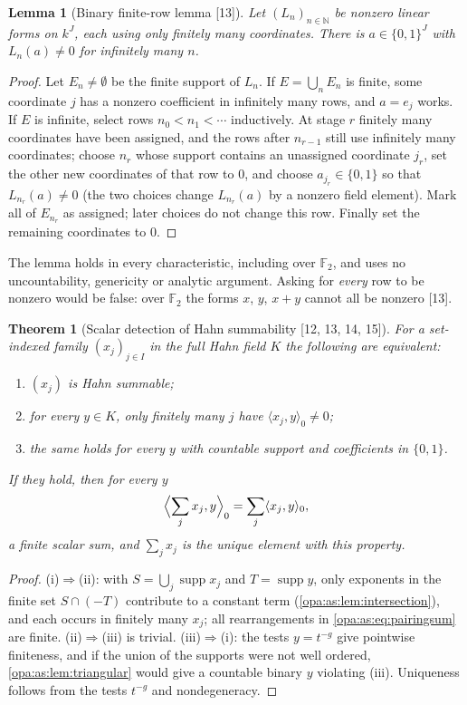\documentclass[11pt,oneside]{article}
\numberwithin{equation}{section}
\newtheorem{theorem}{Theorem}[section]
\newtheorem{lemma}[lemma]{Lemma}
\theoremstyle{definition}
\theoremstyle{remark}
\newcommand{\N}{\mathbb N}
\newcommand{\supp}{\operatorname{supp}}
\newcommand{\src}[1]{\textup{\textsf{\small[#1]}}}
\newcommand{\pairing}[2]{\langle #1,#2\rangle_0}
\begin{document}
\begin{lemma}[Binary finite-row lemma \src{13}]\label{opa:as:lem:binary}
Let $(L_n)_{n\in\N}$ be nonzero linear forms on $k^J$, each using only finitely many
coordinates. There is $a\in\{0,1\}^J$ with $L_n(a)\ne0$ for infinitely many $n$.
\end{lemma}
\begin{proof}
Let $E_n\ne\emptyset$ be the finite support of $L_n$. If $E=\bigcup_nE_n$ is finite, some
coordinate $j$ has a nonzero coefficient in infinitely many rows, and $a=e_j$ works. If
$E$ is infinite, select rows $n_0<n_1<\cdots$ inductively. At stage $r$ finitely many
coordinates have been assigned, and the rows after $n_{r-1}$ still use infinitely many
coordinates; choose $n_r$ whose support contains an unassigned coordinate $j_r$, set the
other new coordinates of that row to $0$, and choose $a_{j_r}\in\{0,1\}$ so that
$L_{n_r}(a)\ne0$ (the two choices change $L_{n_r}(a)$ by a nonzero field element). Mark all
of $E_{n_r}$ as assigned; later choices do not change this row. Finally set the remaining
coordinates to $0$.
\end{proof}

The lemma holds in every characteristic, including over $\mathbb F_2$, and uses no
uncountability, genericity or analytic argument. Asking for \emph{every} row to be nonzero
would be false: over $\mathbb F_2$ the forms $x$, $y$, $x+y$ cannot all be nonzero
\src{13}.

\begin{theorem}[Scalar detection of Hahn summability \src{12, 13, 14, 15}]\label{opa:as:thm:detect}
For a set-indexed family $(x_j)_{j\in I}$ in the full Hahn field $K$ the following are
equivalent:
\begin{enumerate}[label=\textup{(\roman*)},itemsep=1pt]
\item $(x_j)$ is Hahn summable;
\item for every $y\in K$, only finitely many $j$ have $\pairing{x_j}y\ne0$;
\item the same holds for every $y$ with countable support and coefficients in $\{0,1\}$.
\end{enumerate}
If they hold, then for every $y$
\begin{equation}\label{opa:as:eq:pairingsum}
 \Bigl\langle\sum_jx_j,y\Bigr\rangle_0=\sum_j\pairing{x_j}y,
\end{equation}
a finite scalar sum, and $\sum_jx_j$ is the unique element with this property.
\end{theorem}
\begin{proof}
(i)$\Rightarrow$(ii): with $S=\bigcup_j\supp x_j$ and $T=\supp y$, only exponents in the
finite set $S\cap(-T)$ contribute to a constant term (\cref{opa:as:lem:intersection}), and
each occurs in finitely many $x_j$; all rearrangements in \eqref{opa:as:eq:pairingsum} are
finite. (ii)$\Rightarrow$(iii) is trivial. (iii)$\Rightarrow$(i): the tests $y=t^{-g}$
give pointwise finiteness, and if the union of the supports were not well ordered,
\cref{opa:as:lem:triangular} would give a countable binary $y$ violating (iii).
Uniqueness follows from the tests $t^{-g}$ and nondegeneracy.
\end{proof}
\end{document}
